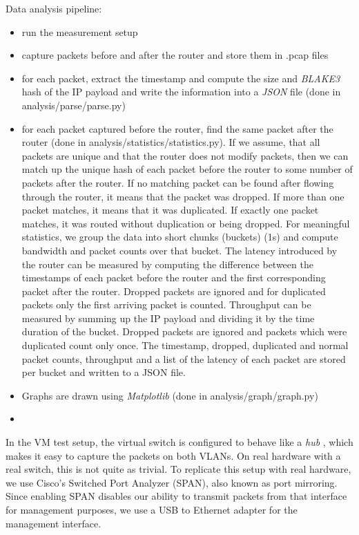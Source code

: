 Data analysis pipeline:
\begin{itemize}
  \item run the measurement setup
  \item capture packets before and after the router and store them in .pcap files
  \item for each packet, extract the timestamp and compute the size and \textit{BLAKE3} \cite{wiki:BLAKE3} hash of the IP payload and write the information into a \textit{JSON} \cite{wiki:JSON} file (done in analysis/parse/parse.py)
  \item for each packet captured before the router, find the same packet after the router (done in analysis/statistics/statistics.py). If we assume, that all packets are unique and that the router does not modify packets, then we can match up the unique hash of each packet before the router to some number of packets after the router. If no matching packet can be found after flowing through the router, it means that the packet was dropped. If more than one packet matches, it means that it was duplicated. If exactly one packet matches, it was routed without duplication or being dropped. For meaningful statistics, we group the data into short chunks (buckets) (1s) and compute bandwidth and packet counts over that bucket. The latency introduced by the router can be measured by computing the difference between the timestamps of each packet before the router and the first corresponding packet after the router. Dropped packets are ignored and for duplicated packets only the first arriving packet is counted. Throughput can be measured by summing up the IP payload  and dividing it by the time duration of the bucket. Dropped packets are ignored and packets which were duplicated count only once. The timestamp, dropped, duplicated and normal packet counts, throughput and a list of the latency of each packet are stored per bucket and written to a JSON file.
  \item Graphs are drawn using \textit{Matplotlib} \cite{Matplotlib} (done in analysis/graph/graph.py)
  \item {}
\end{itemize}


In the VM test setup, the virtual switch is configured to behave like a \textit{hub} \cite{wiki:Ethernet_hub} \cite{NixOS-VM-test-Hub}, which makes it easy to capture the packets on both VLANs. On real hardware with a real switch, this is not quite as trivial. To replicate this setup with real hardware, we use Cisco's Switched Port Analyzer (SPAN), also known as port mirroring. Since enabling SPAN disables our ability to transmit packets from that interface for management purposes, we use a USB to Ethernet adapter for the management interface.
